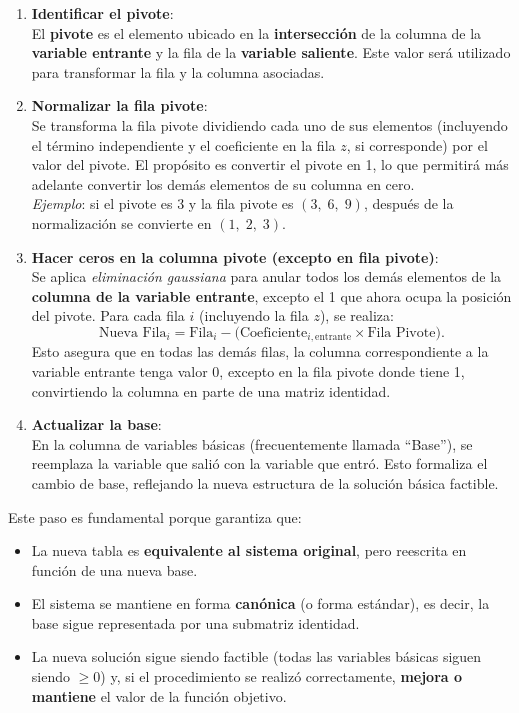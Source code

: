 \begin{enumerate}
  \item \textbf{Identificar el pivote}:\\
    El \textbf{pivote} es el elemento ubicado en la \textbf{intersección} de
    la columna de la \textbf{variable entrante} y la fila de la
    \textbf{variable saliente}. Este valor será utilizado para transformar la
    fila y la columna asociadas.

  \item \textbf{Normalizar la fila pivote}:\\
    Se transforma la fila pivote dividiendo cada uno de sus elementos
    (incluyendo el término independiente y el coeficiente en la fila \(z\), si
    corresponde) por el valor del pivote. El propósito es convertir el pivote
    en 1, lo que permitirá más adelante convertir los demás elementos de su
    columna en cero.\\
    \emph{Ejemplo}: si el pivote es 3 y la fila pivote es \((3,\;6,\;9)\), después
    de la normalización se convierte en \((1,\;2,\;3)\).

  \item \textbf{Hacer ceros en la columna pivote (excepto en fila pivote)}:\\
    Se aplica \emph{eliminación gaussiana} para anular todos los demás
    elementos de la \textbf{columna de la variable entrante}, excepto el 1 que
    ahora ocupa la posición del pivote. Para cada fila \(i\) (incluyendo la fila
    \(z\)), se realiza:
    \[
      \text{Nueva Fila}_i
      = \text{Fila}_i
      - \bigl(\text{Coeficiente}_{i,\mathrm{entrante}} \times \text{Fila Pivote}\bigr).
    \]
    Esto asegura que en todas las demás filas, la columna correspondiente a la
    variable entrante tenga valor 0, excepto en la fila pivote donde tiene 1,
    convirtiendo la columna en parte de una matriz identidad.

  \item \textbf{Actualizar la base}:\\
    En la columna de variables básicas (frecuentemente llamada ``Base''), se
    reemplaza la variable que salió con la variable que entró. Esto formaliza
    el cambio de base, reflejando la nueva estructura de la solución básica
    factible.
\end{enumerate}
Este paso es fundamental porque garantiza que:
\begin{itemize}
  \item La nueva tabla es \textbf{equivalente al sistema original}, pero
    reescrita en función de una nueva base.
  \item El sistema se mantiene en forma \textbf{canónica} (o forma estándar), es decir, la base
    sigue representada por una submatriz identidad.
  \item La nueva solución sigue siendo factible (todas las variables básicas
    siguen siendo \(\ge 0\)) y, si el procedimiento se realizó correctamente,
    \textbf{mejora o mantiene} el valor de la función objetivo.
\end{itemize}

